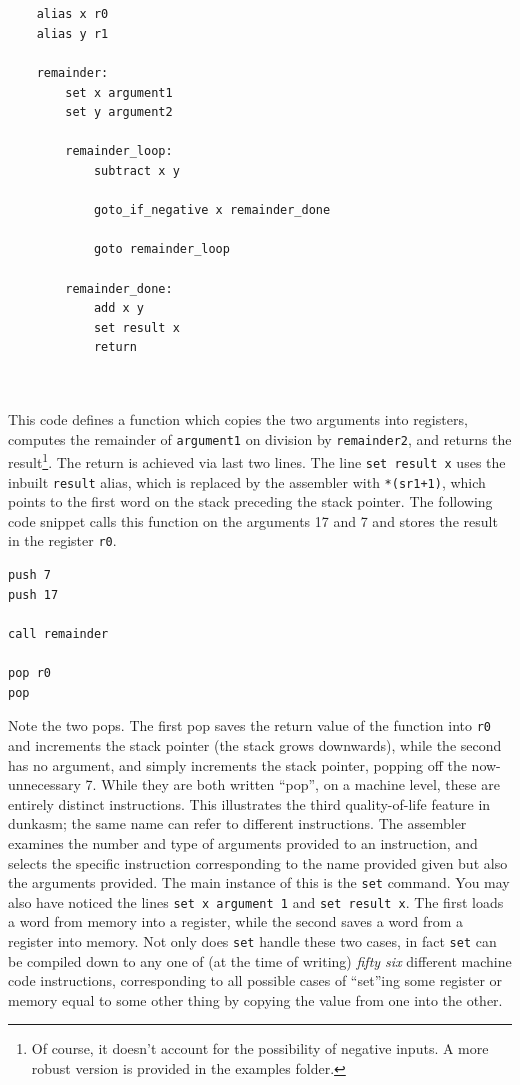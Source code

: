 \documentclass{article}
\begin{document}
\begin{BVerbatim}


    alias x r0
    alias y r1

    remainder:
        set x argument1
        set y argument2
        
        remainder_loop:
	        subtract x y
	        
	        goto_if_negative x remainder_done
	        
	        goto remainder_loop
        
        remainder_done:
	        add x y
	        set result x
	        return
	        
	        
\end{BVerbatim}

This code defines a function which copies the two arguments into registers, computes the remainder of \Verb|argument1| on division by \Verb|remainder2|, and returns the result\footnote{Of course, it doesn't account for the possibility of negative inputs. A more robust version is provided in the examples folder.}. The return is achieved via last two lines. The line \Verb|set result x| uses the inbuilt \Verb|result| alias, which is replaced by the assembler with \Verb|*(sr1+1)|, which points to the first word on the stack preceding the stack pointer. The following code snippet calls this function on the arguments 17 and 7 and stores the result in the register \Verb|r0|.

\begin{center}
\begin{BVerbatim}
push 7
push 17

call remainder

pop r0
pop
\end{BVerbatim}
\end{center}

Note the two pops. The first pop saves the return value of the function into \Verb|r0| and increments the stack pointer (the stack grows downwards), while the second has no argument, and simply increments the stack pointer, popping off the now-unnecessary 7. While they are both written ``pop'', on a machine level, these are entirely distinct instructions. This illustrates the third quality-of-life feature in dunkasm; the same name can refer to different instructions. The assembler examines the number and type of arguments provided to an instruction, and selects the specific instruction corresponding to the name provided given but also the arguments provided. The main instance of this is the \Verb|set| command. You may also have noticed the lines \Verb|set x argument 1| and \Verb|set result x|. The first loads a word from memory into a register, while the second saves a word from a register into memory. Not only does \Verb|set| handle these two cases, in fact \Verb|set| can be compiled down to any one of (at the time of writing) \textit{fifty six} different machine code instructions, corresponding to all possible cases of ``set''ing some register or memory equal to some other thing by copying the value from one into the other.
\end{document}
